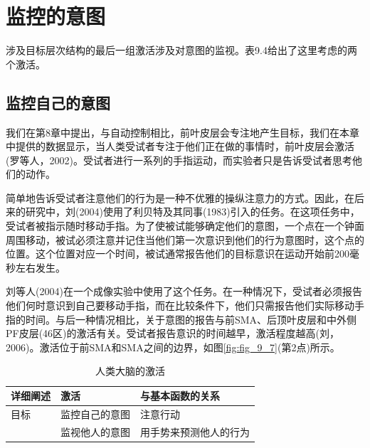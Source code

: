 \section{监控的意图}
\par
涉及目标层次结构的最后一组激活涉及对意图的监视。表9.4给出了这里考虑的两个激活。
\par
\subsection{监控自己的意图}
\par
我们在第8章中提出，与自动控制相比，前叶皮层会专注地产生目标，我们在本章中提供的数据显示，当人类受试者专注于他们正在做的事情时，前叶皮层会激活(罗等人，2002)。受试者进行一系列的手指运动，而实验者只是告诉受试者思考他们的动作。
\par
简单地告诉受试者注意他们的行为是一种不优雅的操纵注意力的方式。因此，在后来的研究中，刘(2004)使用了利贝特及其同事(1983)引入的任务。在这项任务中，受试者被指示随时移动手指。为了使被试能够确定他们的意图，一个点在一个钟面周围移动，被试必须注意并记住当他们第一次意识到他们的行为意图时，这个点的位置。这个位置对应一个时间，被试通常报告他们的目标意识在运动开始前200毫秒左右发生。
\par
刘等人(2004)在一个成像实验中使用了这个任务。在一种情况下，受试者必须报告他们何时意识到自己要移动手指，而在比较条件下，他们只需报告他们实际移动手指的时间。与后一种情况相比，关于意图的报告与前SMA、后顶叶皮层和中外侧PF皮层(46区)的激活有关。受试者报告意识的时间越早，激活程度越高(刘，2006)。激活位于前SMA和SMA之间的边界，如图\ref{fig:fig_9_7}(第2点)所示。
\par

\begin{table}[htbp] 
	\newcommand{\tabincell}[2]{\begin{tabular}{@{}#1@{}}#2\end{tabular}} %
	\centering
	\caption{人类大脑的激活\label{tab:9_4}}
	\renewcommand\arraystretch{1.5}	%
	\begin{tabular}{lll}
		\toprule
		详细阐述 & 激活 & 与基本函数的关系\\
		\midrule
		目标 & 监控自己的意图 & 注意行动  \\
		& 监视他人的意图 & 用手势来预测他人的行为 \\
		\bottomrule
		
	\end{tabular}%
\end{table}%


